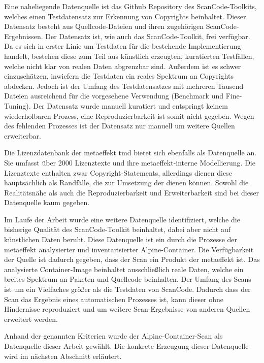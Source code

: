 Eine naheliegende Datenquelle ist das Github Repository des ScanCode-Toolkits, welches einen Testdatensatz zur Erkennung von Copyrights beinhaltet.
Dieser Datensatz besteht aus Quellcode-Dateien und ihren zugehörigen ScanCode-Ergebnissen.
Der Datensatz ist, wie auch das ScanCode-Toolkit, frei verfügbar.
Da es sich in erster Linie um Testdaten für die bestehende Implementierung handelt, bestehen diese zum Teil aus künstlich erzeugten, kuratierten Testfällen, welche nicht klar von realen Daten abgrenzbar sind.
Außerdem ist es schwer einzuschätzen, inwiefern die Testdaten ein reales Spektrum an Copyrights abdecken.
Jedoch ist der Umfang des Testdatensatzes mit mehreren Tausend Dateien ausreichend für die vorgesehene Verwendung (Benchmark und Fine-Tuning).
Der Datensatz wurde manuell kuratiert und entspringt keinem wiederholbaren Prozess, eine Reproduzierbarkeit ist somit nicht gegeben.
Wegen des fehlenden Prozesses ist der Datensatz nur manuell um weitere Quellen erweiterbar.

Die Lizenzdatenbank der metaeffekt \gls{tmd} bietet sich ebenfalls als Datenquelle an.
Sie umfasst über \num{2000} Lizenztexte und ihre metaeffekt-interne Modellierung.
Die Lizenztexte enthalten zwar Copyright-Statements, allerdings dienen diese hauptsächlich als Randfälle, die zur Umsetzung der  dienen können.
Sowohl die Realitätsnähe als auch die Reproduzierbarkeit und Erweiterbarkeit sind bei dieser Datenquelle kaum gegeben.

Im Laufe der Arbeit wurde eine weitere Datenquelle identifiziert, welche die bisherige Qualität des ScanCode-Toolkit beinhaltet, dabei aber nicht auf künstlichen Daten beruht.
Diese Datenquelle ist ein durch die Prozesse der metaeffekt analysierter und inventarisierter Alpine-Container.
Die Verfügbarkeit der Quelle ist dadurch gegeben, dass der Scan ein Produkt der metaeffekt ist.
Das analysierte Container-Image beinhaltet ausschließlich reale Daten, welche ein breites Spektrum an Paketen und Quellcode beinhalten.
Der Umfang des Scans ist um ein Vielfaches größer als die Testdaten von ScanCode.
Dadurch dass der Scan das Ergebnis eines automatischen Prozesses ist, kann dieser ohne Hindernisse reproduziert und um weitere Scan-Ergebnisse von anderen Quellen erweitert werden.

Anhand der genannten Kriterien wurde der Alpine-Container-Scan als Datenquelle dieser Arbeit gewählt.
Die konkrete Erzeugung dieser Datenquelle wird im nächsten Abschnitt erläutert.



